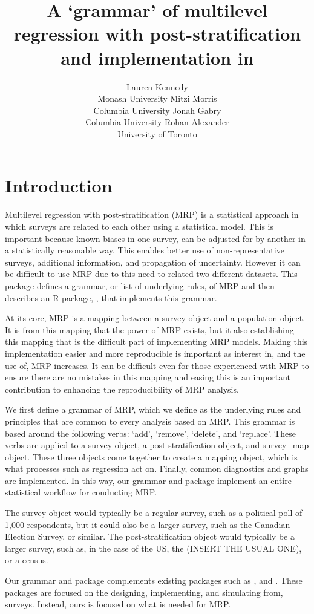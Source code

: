 \documentclass[
]{jss}
\author{
Lauren Kennedy\\Monash University \And Mitzi Morris\\Columbia
University \And Jonah Gabry\\Columbia University \And Rohan
Alexander\\University of Toronto
}
\title{\pkg{MRP-Kit} A `grammar' of multilevel regression with
post-stratification and implementation in \proglang{R}}
\begin{document}
\section[Introduction]{Introduction} \label{sec:intro}

Multilevel regression with post-stratification (MRP) is a statistical
approach in which surveys are related to each other using a statistical
model. This is important because known biases in one survey, can be
adjusted for by another in a statistically reasonable way. This enables
better use of non-representative surveys, additional information, and
propagation of uncertainty. However it can be difficult to use MRP due
to this need to related two different datasets. This package defines a
grammar, or list of underlying rules, of MRP and then describes an R
package, , that implements this grammar.

At its core, MRP is a mapping between a survey object and a population
object. It is from this mapping that the power of MRP exists, but it
also establishing this mapping that is the difficult part of
implementing MRP models. Making this implementation easier and more
reproducible is important as interest in, and the use of, MRP increases.
It can be difficult even for those experienced with MRP to ensure there
are no mistakes in this mapping and easing this is an important
contribution to enhancing the reproducibility of MRP analysis.

We first define a grammar of MRP, which we define as the underlying
rules and principles that are common to every analysis based on MRP.
This grammar is based around the following verbs: `add', `remove',
`delete', and `replace'. These verbs are applied to a survey object, a
post-stratification object, and survey\_map object. These three objects
come together to create a mapping object, which is what processes such
as regression act on. Finally, common diagnostics and graphs are
implemented. In this way, our grammar and package implement an entire
statistical workflow for conducting MRP.

The survey object would typically be a regular survey, such as a
political poll of 1,000 respondents, but it could also be a larger
survey, such as the Canadian Election Survey, or similar. The
post-stratification object would typically be a larger survey, such as,
in the case of the US, the (INSERT THE USUAL ONE), or a census.

Our grammar and package complements existing packages such as
 \citep[\citet{lumleytwo},
\citet{lumleythree}]{lumleyone}, and 
\citep{citeDeclareDesign}. These packages are focused on the designing,
implementing, and simulating from, surveys. Instead, ours is focused on
what is needed for MRP.
\end{document}

